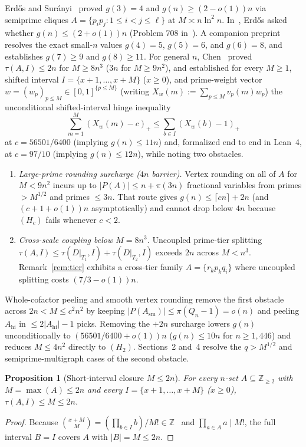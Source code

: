 \documentclass[11pt]{article}
\newtheorem{proposition}[theorem]{Proposition}
\theoremstyle{remark}
\begin{document}
Erd\H{o}s and Sur\'anyi~\cite{erdossuranyi59} proved $g(3) = 4$ and $g(n) \ge (2 - o(1)) n$ via semiprime cliques $A = \{p_i p_j : 1 \le i < j \le \ell\}$ at $M \asymp n \ln^2 n$. In~\cite{erdos92c,erdos95}, Erd\H{o}s asked whether $g(n) \le (2 + o(1)) n$ (Problem 708 in~\cite{bloom708}). A companion preprint~\cite{bergstrom26small} resolves the exact small-$n$ values $g(4) = 5$, $g(5) = 6$, and $g(6) = 8$, and establishes $g(7) \ge 9$ and $g(8) \ge 11$. For general $n$, Chen~\cite{chen26} proved $\tau(A, I) \le 2 n$ for $M \ge 8 n^3$ ($3 n$ for $M \ge 9 n^2$), and established for every $M \ge 1$, shifted interval $I = \{x + 1, \dots, x + M\}$ ($x \ge 0$), and prime-weight vector $w = (w_p)_{p \le M} \in [0, 1]^{\{p \le M\}}$ (writing $X_w(m) := \sum_{p \le M} v_p(m) w_p$) the unconditional shifted-interval hinge inequality
\[
\sum_{m = 1}^M (X_w(m) - c)_+ \le \sum_{b \in I} (X_w(b) - 1)_+
\]
at $c = 56501 / 6400$ (implying $g(n) \le 11 n$) and, formalized end to end in Lean~4, at $c = 97 / 10$ (implying $g(n) \le 12 n$), while noting two obstacles.

\begin{enumerate}
\item \emph{Large-prime rounding surcharge ($4 n$ barrier).} Vertex rounding on all of $A$ for $M < 9 n^2$ incurs up to $|P(A)| \le n + \pi(3 n)$ fractional variables from primes $> M^{1/2}$ and primes $\le 3 n$. That route gives $g(n) \le \lceil c n \rceil + 2 n$ (and $(c + 1 + o(1)) n$ asymptotically) and cannot drop below $4 n$ because $(H_c)$ fails whenever $c < 2$.
\item \emph{Cross-scale coupling below $M = 8 n^3$.} Uncoupled prime-tier splitting $\tau(A, I) \le \tau(D|_{T_1}, I) + \tau(D|_{T_2}, I)$ exceeds $2 n$ across $M < n^3$. Remark~\ref{rem:tier} exhibits a cross-tier family $A = \{r_k p_k q_i\}$ where uncoupled splitting costs $(7/3 - o(1)) n$.
\end{enumerate}

Whole-cofactor peeling and smooth vertex rounding remove the first obstacle across $2 n < M \le c^2 n^2$ by keeping $|P(A_{\mathrm{sm}})| \le \pi(Q_n - 1) = o(n)$ and peeling $A_{\mathrm{hi}}$ in $\le 2 |A_{\mathrm{hi}}| - 1$ picks. Removing the $+2 n$ surcharge lowers $g(n)$ unconditionally to $(56501 / 6400 + o(1)) n$ ($g(n) \le 10 n$ for $n \ge 1{,}446$) and reduces $M \le 4 n^2$ directly to $(H_2)$. Sections~2 and~4 resolve the $q > M^{1/2}$ and semiprime-multigraph cases of the second obstacle.

\begin{proposition}[Short-interval closure $M \le 2 n$]
\label{prop:short}
For every $n$-set $A \subseteq \mathbb{Z}_{\ge 2}$ with $M = \max(A) \le 2 n$ and every $I = \{x + 1, \dots, x + M\}$ ($x \ge 0$), $\tau(A, I) \le M \le 2 n$.
\end{proposition}
\begin{proof}
Because $\binom{x + M}{M} = (\prod_{b \in I} b) / M! \in \mathbb{Z}$~\cite{hardywright08} and $\prod_{a \in A} a \mid M!$, the full interval $B = I$ covers $A$ with $|B| = M \le 2 n$.
\end{proof}
\end{document}
